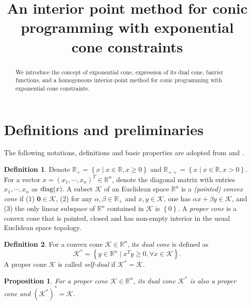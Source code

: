 \documentclass[11pt]{article}
\title{An interior point method for conic programming with exponential cone constraints}
\theoremstyle{definition}
\newtheorem{defin}{Definition}
\theoremstyle{plain}
\newtheorem{prop}{Proposition}
\def\diagonal{\protect{\textnormal{diag}}}
\begin{document}
\maketitle

\begin{abstract}
We introduce the concept of exponential cone, expression of its dual cone, barrier functions, and a homogeneous interior-point method for conic programming with exponential cone constraints.
\end{abstract}

\section{Definitions and preliminaries}
The following notations, definitions and basic properties are adopted from \cite{Robert_thesis} and \cite{Akle_thesis}.

\begin{defin} Denote $\mathbb{R}_+ = \left\{x \mid x\in \mathbb{R}, x\geq 0\right\}$ and $\mathbb{R}_{++} = \left\{x \mid x\in \mathbb{R}, x> 0\right\}$. For a vector $x = (x_1, \cdots, x_n)^T \in \mathbb{R}^n$, denote the diagonal matrix with entries $x_1, \cdots, x_n$ as $\diagonal(x)$. A subset $\mathcal{K}$ of an Euclidean space $\mathbb{R}^n$ is a \textit{(pointed) convex cone} if (1) $\mathbf{0} \in \mathcal{K}$, (2) for any $\alpha, \beta \in \mathbb{R}_+$ and $x,y \in \mathcal{K}$, one has $\alpha x + \beta y \in \mathcal{K}$, and (3) the only linear subspace of $\mathbb{R}^n$ contained in $\mathcal{K}$ is $\left\{0\right\}$. A \textit{proper cone} is a convex cone that is pointed, closed and has non-empty interior in the usual Euclidean space topology.
\end{defin}

\begin{defin}
	For a convex cone $\mathcal{K} \in \mathbb{R}^n$, its \textit{dual cone} is defined as 
	\[\mathcal{K}^* = \left\{y\in \mathbb{R}^n \mid x^T y\geq 0, \forall x \in \mathcal{K} \right\}.\]
	A proper cone $\mathcal{K}$ is called \textit{self-dual} if $\mathcal{K}^* = \mathcal{K}$.
\end{defin}
\begin{prop}
	For a proper cone $\mathcal{K} \in \mathbb{R}^n$, its dual cone $\mathcal{K}^*$ is also a proper cone and  $(\mathcal{K}^*)^* = \mathcal{K}$. 
\end{prop}
\end{document}
